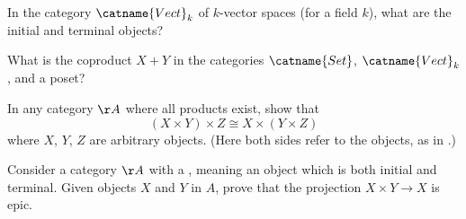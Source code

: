 \begin{problem}
	In the category $\catname{Vect}_k$ of $k$-vector spaces
	(for a field $k$),
	what are the initial and terminal objects?
\end{problem}

\begin{dproblem}
	What is the coproduct $X+Y$ in the categories
	$\catname{Set}$, $\catname{Vect}_k$, and a poset?
\end{dproblem}

\begin{problem}
	In any category $\AA$ where all products exist,
	show that \[ (X \times Y) \times Z \cong X \times (Y \times Z) \]
	where $X$, $Y$, $Z$ are arbitrary objects.
	(Here both sides refer to the objects, as in .)
	\label{prob:associative_product}
\end{problem}

\begin{problem}
	\onechili
	Consider a category $\AA$ with a ,
	meaning an object which is both initial and terminal.
	Given objects $X$ and $Y$ in $A$,
	prove that the projection $X \times Y \to X$ is epic.
\end{problem}
